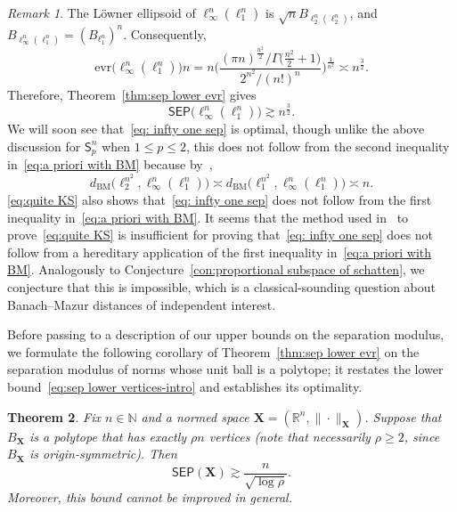 \documentclass[11pt,reqno]{amsart}
\renewcommand{\le}{\leqslant}
\renewcommand{\ge}{\geqslant}
\newcommand{\evr}{\mathrm{evr}}
\newcommand{\X}{\mathbf X}
\newcommand{\R}{\mathbb R}
\newtheorem{theorem}{Theorem}
\theoremstyle{remark}
\newtheorem{remark}[theorem]{Remark}
\newcommand{\sfS}{\mathsf{S}}
\newcommand{\N}{\mathbb N}
\newcommand{\BM}{\mathrm{BM}}
\renewcommand{\1}{\mathbf 1}
\newcommand{\sep}{\mathsf{SEP}}
\begin{document}
\begin{remark} The L\"owner ellipsoid of $\ell_\infty^n(\ell_1^n)$ is $\sqrt{n}B_{\ell_2^n(\ell_2^n)}$, and $B_{\ell_\infty^n(\ell_1^n)}=(B_{\ell_1^n})^n$. Consequently,
$$
\evr\big(\ell_\infty^n(\ell_1^n)\big)n=
 n\Bigg(\frac{(\pi n)^{\frac{n^2}{2}}/\Gamma\big(\frac{n^2}{2}+1\big)}{2^{n^2}/(n!)^n}\Bigg)^{\frac{1}{n^2}}\asymp n^{\frac{3}{2}}.
$$
Therefore,  Theorem~\ref{thm:sep lower evr} gives
\begin{equation}\label{eq: infty one sep}
\sep\big(\ell_\infty^n(\ell_1^n)\big)\gtrsim n^{\frac32}.
\end{equation}
We will soon see that~\eqref{eq: infty one sep} is optimal, though unlike the above discussion for $\sfS_p^n$ when $1\le p\le 2$, this does not follow from the second inequality in~\eqref{eq:a priori with BM} because by~\cite{KS89},
\begin{equation}\label{eq:quite KS}
d_{\BM}\big(\ell_2^{n^2},\ell_\infty^n(\ell_1^n)\big)\asymp d_{\BM}\big(\ell_1^{n^2},\ell_\infty^n(\ell_1^n)\big)\asymp n.
\end{equation}
\eqref{eq:quite KS} also shows that~\eqref{eq: infty one sep} does not follow from  the first inequality in~\eqref{eq:a priori with BM}. It seems that the method used in~\cite{KS89} to prove~\eqref{eq:quite KS} is insufficient for proving that~\eqref{eq: infty one sep}    does not follow from a hereditary application of the first inequality in~\eqref{eq:a priori with BM}. Analogously to Conjecture~\ref{con:proportional subspace of schatten}, we conjecture that this is impossible, which is a classical-sounding question about Banach--Mazur distances of independent interest.
\end{remark}

Before passing to a description of our upper bounds on the separation modulus, we formulate the following corollary of Theorem~\ref{thm:sep lower evr} on the separation modulus of norms whose unit ball is a polytope; it restates the lower bound~\eqref{eq:sep lower vertices-intro} and establishes its optimality.


\begin{theorem}\label{cor:sep lower vertices} Fix $n\in \N$ and a normed space $\X=(\R^n,\|\cdot\|_{\X})$.
Suppose that $B_{\X}$ is a polytope that has exactly $\rho n$ vertices (note that necessarily $\rho\ge 2$, since $B_{\X}$ is origin-symmetric). Then
\begin{equation}\label{eq:sep lower vertices}
\sep(\X)\gtrsim \frac{n}{\sqrt{\log \rho}}.
\end{equation}
Moreover, this bound cannot be improved in general.
\end{theorem}
\end{document}

